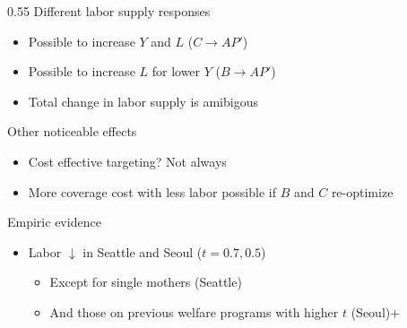\documentclass[aspectratio=169]{beamer}
\begin{document}
\begin{frame}
\begin{columns}
\begin{column}{0.55\textwidth}
 Different labor supply responses
\begin{itemize}\setlength\itemsep{3pt}
\item Possible to increase $Y$ and $L$ ($C\to AP'$)
\item Possible to increase $L$ for lower $Y$ ($B\to AP'$)
\item Total change in labor supply is amibigous
\end{itemize}\medskip 
Other noticeable effects
\begin{itemize}\setlength\itemsep{3pt}
\item Cost effective targeting? Not always
\item More coverage cost with less labor possible if $B$ and $C$ re-optimize
\end{itemize}\medskip
Empiric evidence
\begin{itemize}\setlength\itemsep{3pt}
\item Labor $\downarrow$ in Seattle and Seoul ($t=0.7,0.5$)
\begin{itemize}
\item Except for single mothers (Seattle)
\item And those on previous welfare programs with higher $t$ (Seoul)+
\end{itemize}
\end{itemize}\medskip
\end{column}
\end{columns}
\end{frame}
\end{document}
